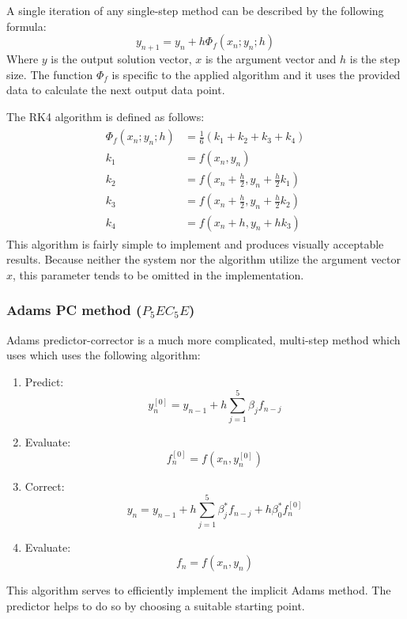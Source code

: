 \documentclass{article}
\begin{document}
	A single iteration of any single-step method can be described by the
	following formula:
	\begin{equation}
		y_{n + 1} = y_n + h\Phi_f(x_n; y_n; h)
	\end{equation}
	Where $y$ is the output solution vector, $x$ is the argument vector and
	$h$ is the step size. The function $\Phi_f$ is specific to the applied
	algorithm and it uses the provided data to calculate the next output
	data point.
	
	The RK4 algorithm is defined as follows:
	\begin{align}
		\begin{split}
			\Phi_f(x_n; y_n; h) &= \frac{1}{6}(k_1 + k_2 + k_3 + k_4)\\
			k_1 &= f(x_n, y_n)\\
			k_2 &= f(x_n + \frac{h}{2}, y_n + \frac{h}{2}k_1)\\
			k_3 &= f(x_n + \frac{h}{2}, y_n + \frac{h}{2}k_2)\\
			k_4 &= f(x_n + h, y_n + hk_3)
		\end{split}
	\end{align}
	This algorithm is fairly simple to implement and produces visually
	acceptable results. Because neither the system nor the algorithm utilize
	the argument vector $x$, this parameter tends to be omitted in the
	implementation.
	
	\subsubsection{Adams PC method ($P_5EC_5E$)}
	
	Adams predictor-corrector is a much more complicated, multi-step method
	which uses which uses the following algorithm:
	\begin{enumerate}
		\item Predict:
			\begin{equation*}
				y^{[0]}_n = y_{n - 1} + h\sum_{j=1}^{5}\beta_j f_{n-j}
			\end{equation*}
		\item Evaluate:
			\begin{equation*}
				f^{[0]}_n = f(x_n, y^{[0]}_n)
			\end{equation*}
		\item Correct:
			\begin{equation*}
				y_n = y_{n - 1} + h\sum_{j=1}^{5}\beta^*_j f_{n-j}
				+ h\beta^*_0f^{[0]}_n
			\end{equation*}
		\item Evaluate:
			\begin{equation*}
				f_n = f(x_n, y_n)
			\end{equation*}
	\end{enumerate}
	This algorithm serves to efficiently implement the implicit Adams
	method. The predictor helps to do so by choosing a suitable starting
	point.
	
\end{document}
